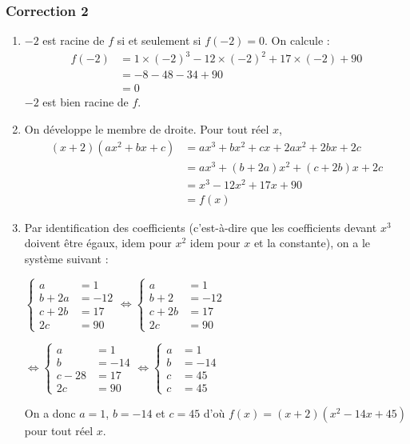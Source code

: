 \documentclass[15pt, mathserif]{beamer}
\begin{document}
\begin{frame}
\vspace{-10mm}
	\frametitle{Correction 2}
\bigskip 
 \begin{enumerate} 
 	 \item $-2$ est racine de $f$ si et seulement si $f(-2)=0$. On calcule : 
 	 	 \begin{align*}f(-2)&= 1 \times \left(-2\right)^3 -12 \times \left(-2\right)^2+17\times \left(-2\right)+90 \\ 
 &= -8-48-34+90 \\ 
 &= 0 
 	  \end{align*} 
  $-2$ est bien racine de $f$. 
 	 \item On développe le membre de droite. Pour tout réel $x$, 
 	 \begin{align*} (x+2)(ax^2+bx+c) 
 &= ax^3+bx^2+cx+2ax^2+2bx+2c \\ 
   &= ax^3 +(b+2a)x^2+(c+2b)x+2c \\ 
 &= x^3-12x^2+17x+90\\ 
 &= f(x)
 \end{align*} 
 
 \end{enumerate}
 \end{frame} 
 \begin{frame} 
 \begin{enumerate} 
 \setcounter{enumi}{2} 
 	 \item Par identification des coefficients (c'est-à-dire que les coefficients devant $x^3$ doivent être égaux, idem pour $x^2$ idem pour $x$ et la constante), on a le système suivant : 
 
 \hfil $\begin{cases} 
 a &=1 \\ 
  b+2a &=-12 \\ 
  c+2b &= 17 \\ 
  2c &= 90 
 \end{cases} 
 \Longleftrightarrow 
 \begin{cases} a &=1 \\ 
 b+2&=-12 \\ 
  c+2b &= 17 \\ 
  2c &= 90 
 \end{cases} $ 
 
 \hfil $ \Longleftrightarrow 
 \begin{cases} a &=1 \\ 
 b &=-14 \\ 
  c-28 &= 17 \\ 
  2c &= 90 
 \end{cases} 
  \Longleftrightarrow 
 \begin{cases}  a &=1 \\ 
 b &=-14 \\ 
  c &= 45 \\ 
  c &= 45 
 \end{cases}$ 
 
 On a donc $a=1$, $b=-14$ et $c=45$ d'où $f(x)=(x+2)(x^2-14x+45)$ pour tout réel $x$. 
 \end{enumerate}
 \end{frame} 
\end{document}
